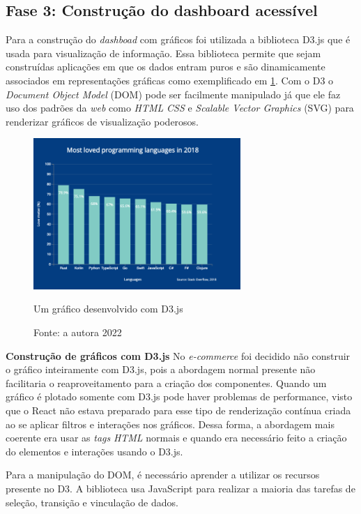 \subsection{Fase 3: Construção do dashboard acessível}
{Para a construção do \textit{dashboad} com gráficos foi utilizada a biblioteca D3.js \cite{D3} que é usada para visualização de informação. Essa biblioteca permite que sejam construídas aplicações em que os dados entram puros e são dinamicamente associados em representações gráficas como exemplificado em \ref{graph:d3}. Com o D3 o \textit{Document Object Model} (DOM) \cite{DOM} pode ser facilmente manipulado já que ele faz uso dos padrões da \textit{web} como \textit{HTML} \textit{CSS} e \textit{Scalable Vector Graphics} (SVG) para renderizar gráficos de visualização poderosos.
\newpage
\begin{figure}[ht]
  	\center
    \includegraphics[width=0.7\textwidth]{images/exemplo-graf-d3.png}
    \caption{Um gráfico desenvolvido com D3.js}
    \caption*{Fonte: a autora 2022}
    \label{graph:d3}
\end{figure} 

}

{\textbf{Construção de gráficos com D3.js}}
No \textit{e-commerce} foi decidido não construir o gráfico inteiramente com D3.js, pois a abordagem normal presente não facilitaria o reaproveitamento para a criação dos componentes. Quando um gráfico é plotado somente com D3.js  pode haver problemas de performance, visto que o React \cite{REACT} não estava preparado para esse tipo de renderização contínua criada ao se aplicar filtros e interações nos gráficos. Dessa forma, a abordagem mais coerente era usar as \textit{tags} \textit{HTML} normais e quando era necessário feito a criação do elementos e interações usando o D3.js.

Para a manipulação do DOM, é necessário aprender a utilizar os recursos presente no D3. A biblioteca usa JavaScript para realizar a maioria das tarefas de seleção, transição e vinculação de dados.

